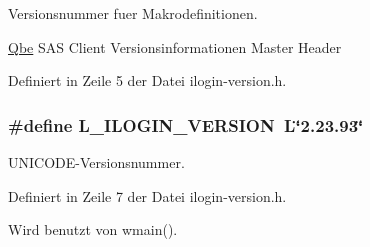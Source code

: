 Versionsnummer fuer Makrodefinitionen. 

\hyperlink{namespaceQbe}{Qbe} SAS Client Versionsinformationen Master Header 

Definiert in Zeile 5 der Datei ilogin-version.h.\hypertarget{ilogin-version_8h_a1}{
\subsubsection[L\_\-ILOGIN\_\-VERSION]{\setlength{\rightskip}{0pt plus 5cm}\#define L\_\-ILOGIN\_\-VERSION\ L\char`\"{}2.23.93\char`\"{}}}
\label{ilogin-version_8h_a1}


UNICODE-Versionsnummer. 



Definiert in Zeile 7 der Datei ilogin-version.h.

Wird benutzt von wmain().
